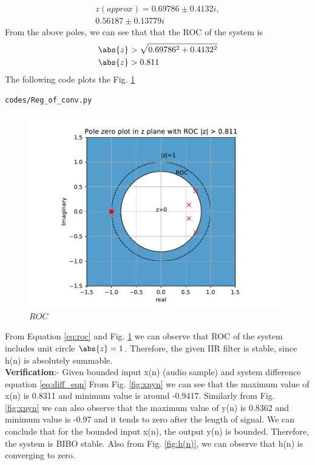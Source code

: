 \documentclass[journal,12pt,twocolumn]{IEEEtran}
\renewcommand\thesection{\arabic{section}}
\begin{document}
\begin{enumerate}[label=\thesection.\arabic*,ref=\thesection.\theenumi]
\begin{equation}
\begin{split}
z(approx) = 0.69786 \pm 0.4132i,
\\
 0.56187 \pm 0.13779i
\end{split}  
\end{equation}
From the above poles, we can see that that the ROC of the system is
\begin{align}
\abs{z}&>\sqrt{0.69786^{2}+0.4132^{2}}
\\
\abs{z}&>0.811
\label{eq:roc}
\end{align}
The following code plots the Fig. \ref{fig:roc}
\begin{lstlisting}
codes/Reg_of_conv.py
\end{lstlisting}
\begin{figure}[!ht]
\centering
\includegraphics[width=\columnwidth]{./figs/roc}
\caption{$ROC$}
\label{fig:roc}
\end{figure}
From Equation \eqref{eq:roc} and Fig. \ref{fig:roc} we can observe that ROC of the system includes unit circle $\abs{z}=1$. Therefore, the given IIR filter is stable, since h(n) is absolutely summable.
\\
\textbf{Verification}:-
Given bounded input x(n) (audio sample) and system difference equation \eqref{eq:diff_eqn}
From Fig. \ref{fig:xnyn} we can see that the maximum value of x(n) is 0.8311 and minimum value is around -0.9417.
Similarly from Fig. \ref{fig:xnyn} we can also observe that the maximum value of y(n) is 0.8362 and minimum value is -0.97 and it tends to zero after the length of signal.
We can conclude that for the bounded input x(n), the output
y(n) is bounded. Therefore, the system is BIBO stable. Also from Fig. \ref{fig:h(n)}, we can observe that h(n) is converging to zero.

\end{enumerate}
\end{document}
